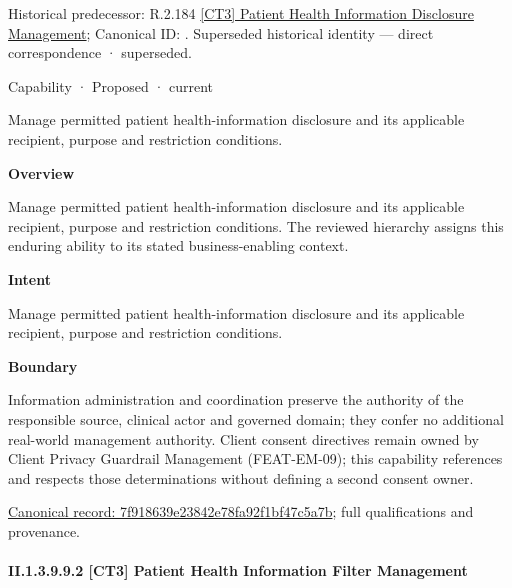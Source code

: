 {\small Historical predecessor: R.2.184 \hyperref[element:07cf507f183d4905a7ad2adbb8555df5]{[CT3] Patient Health Information Disclosure Management}; Canonical ID: \texttt{}. Superseded historical identity — direct correspondence · superseded.}\par
\label{element:7f918639e23842e78fa92f1bf47c5a7b}
{\small Capability · Proposed · current}\par

Manage permitted patient health-information disclosure and its applicable recipient, purpose and restriction conditions.



\textbf{Overview}



Manage permitted patient health-information disclosure and its applicable recipient, purpose and restriction conditions. The reviewed hierarchy assigns this enduring ability to its stated business-enabling context.



\textbf{Intent}



Manage permitted patient health-information disclosure and its applicable recipient, purpose and restriction conditions.



\textbf{Boundary}



Information administration and coordination preserve the authority of the responsible source, clinical actor and governed domain; they confer no additional real-world management authority. Client consent directives remain owned by Client Privacy Guardrail Management (FEAT-EM-09); this capability references and respects those determinations without defining a second consent owner.


{\footnotesize \href{../../../../continuum/strategy/capability/7f918639e23842e78fa92f1bf47c5a7b.md}{Canonical record: 7f918639e23842e78fa92f1bf47c5a7b}; full qualifications and provenance.}\par
\paragraph*{II.1.3.9.9.2 [CT3] Patient Health Information Filter Management}
\label{navigation:II.1.3.9.9.2}

